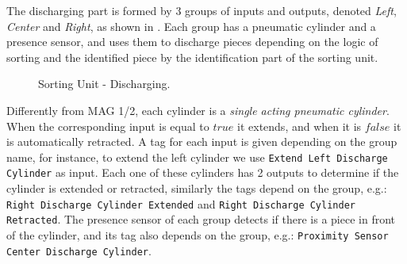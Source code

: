 The discharging part is formed by 3 groups of inputs and outputs, denoted \emph{Left}, \emph{Center} and
\emph{Right}, as shown in . 
Each group has a pneumatic cylinder and a presence sensor, and uses them to discharge pieces
depending on the logic of sorting and the identified piece by the identification
part of the sorting unit.
\begin{figure}[H]
  \centering
  \caption{Sorting Unit - Discharging.}
  \label{fig:sortDisc}
\end{figure}
Differently from MAG 1/2, each cylinder is a \emph{
single acting pneumatic cylinder}. When the corresponding input is equal to $true$ it
extends, and when it is $false$ it is automatically retracted.
A tag for each input is given depending on the group name, for
instance, to extend the left cylinder we use
\verb|Extend Left Discharge Cylinder| as input.
Each one of these cylinders has 2 outputs to determine if the cylinder is
extended or retracted, similarly the tags depend on the group, e.g.:
\verb|Right Discharge Cylinder Extended| and
\verb|Right Discharge Cylinder Retracted|.
The presence sensor of each group detects if there is a piece in front of the
cylinder, and its tag also depends on the group, e.g.:
\verb|Proximity Sensor Center Discharge Cylinder|.

